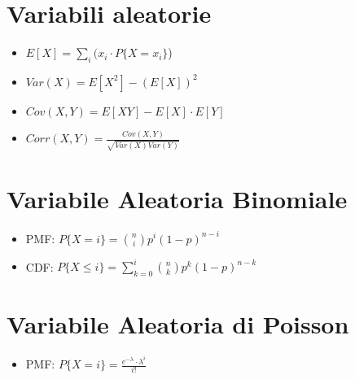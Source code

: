 \documentclass[a4paper,14pt,landscape]{extarticle}
\begin{document}
\begin{multicols*}{2}
    \section*{Variabili aleatorie}
    \begin{itemize}
        \item $E[X] = \sum_i (x_i \cdot P\{X = x_i\}$)
        \item $Var(X) = E[X^2]-(E[X])^2$
        \item $Cov(X,Y) = E[XY]-E[X]\cdot E[Y]$
        \item $Corr(X,Y) = \frac{Cov(X,Y)}{\sqrt{Var(X)Var(Y)}}$
    \end{itemize}

    \section*{Variabile Aleatoria Binomiale}
    \begin{itemize}
        \item PMF: $P\{X = i\} = \binom{n}{i} p^i (1-p)^{n-i}$
        \item CDF: $P\{X \le i\} = \sum_{k=0}^i \binom{n}{k} p^k (1-p)^{n-k}$
    \end{itemize}

    \section*{Variabile Aleatoria di Poisson}
    \begin{itemize}
        \item PMF: $P\{X = i\} = \frac{e^{-\lambda} \cdot \lambda ^i}{i!}$
    \end{itemize}


\end{multicols*}
\end{document}
